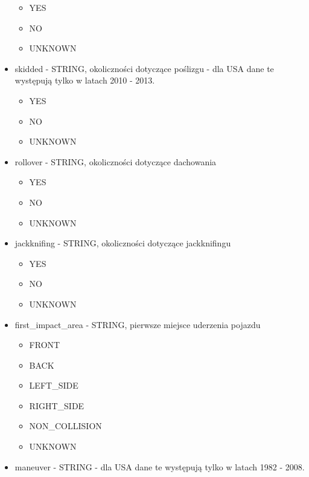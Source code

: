 \begin{itemize}
  \begin{itemize}
  \itemsep-14pt\parskip0pt
  \item
    YES\\
  \item
    NO\\
  \item
    UNKNOWN\\
  \end{itemize}
\item
  skidded - STRING, okoliczności dotyczące poślizgu - dla USA dane te
  występują tylko w latach 2010 - 2013.

  \begin{itemize}
  \itemsep-14pt\parskip0pt
  \item
    YES\\
  \item
    NO\\
  \item
    UNKNOWN\\
  \end{itemize}
\item
  rollover - STRING, okoliczności dotyczące dachowania

  \begin{itemize}
  \itemsep-14pt\parskip0pt
  \item
    YES\\
  \item
    NO\\
  \item
    UNKNOWN\\
  \end{itemize}
\item
  jackknifing - STRING, okoliczności dotyczące jackknifingu

  \begin{itemize}
  \itemsep-14pt\parskip0pt
  \item
    YES\\
  \item
    NO\\
  \item
    UNKNOWN\\
  \end{itemize}
\item
  first\_impact\_area - STRING, pierwsze miejsce uderzenia pojazdu

  \begin{itemize}
  \itemsep-14pt\parskip0pt
  \item
    FRONT\\
  \item
    BACK\\
  \item
    LEFT\_SIDE\\
  \item
    RIGHT\_SIDE\\
  \item
    NON\_COLLISION\\
  \item
    UNKNOWN\\
  \end{itemize}
\item
  maneuver - STRING - dla USA dane te występują tylko w latach 1982 -
  2008.


\end{itemize}
